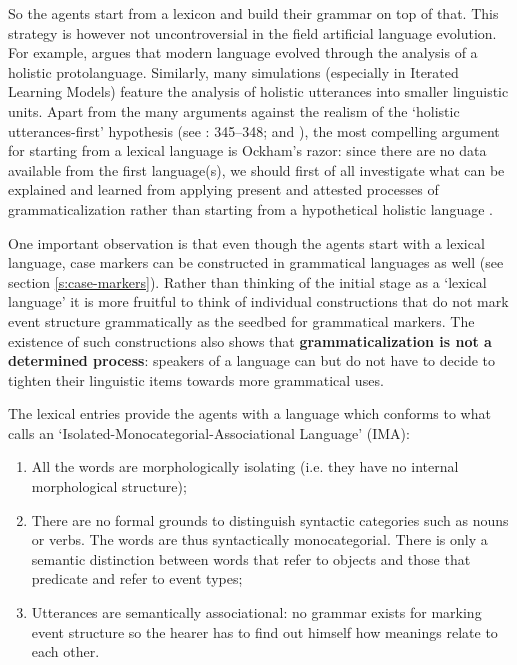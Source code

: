 So the agents start from a lexicon and build their grammar on top of that. This strategy is however not uncontroversial in the field artificial language evolution. For example, \citet{wray98protolanguage, wray02transition} argues that modern language evolved through the analysis of a holistic protolanguage. Similarly, many simulations (especially in Iterated Learning Models) feature the analysis of holistic utterances into smaller linguistic units. Apart from the many arguments against the realism of the `holistic utterances-first' hypothesis (see \citealp{depauw02grael}: 345--348; and \citealp{wellens08flexible}), the most compelling argument for starting from a lexical language is Ockham's razor: since there are no data available from the first language(s), we should first of all investigate what can be explained and learned from applying present and attested processes of grammaticalization rather than starting from a hypothetical holistic language \citep{hoefler08reanalysis}.

One important observation is that even though the agents start with a lexical language, case markers can be constructed in grammatical languages as well (see section \ref{s:case-markers}). Rather than thinking of the initial stage as a `lexical language' it is more fruitful to think of individual constructions that do not mark event structure grammatically as the seedbed for grammatical markers. The existence of such constructions also shows that {\bfseries grammaticalization is not a determined process}: speakers of a language can but do not have to decide to tighten their linguistic items towards more grammatical uses.

The lexical entries provide the agents with a language which conforms to what \citet[124]{gil08how} calls an `Isolated-Monocategorial-Associational Language' (IMA):

\begin{enumerate}
\item All the words are morphologically isolating (i.e. they have no internal morphological structure);
\item There are no formal grounds to distinguish syntactic categories such as nouns or verbs. The words are thus syntactically monocategorial. There is only a semantic distinction between words that refer to objects and those that predicate and refer to event types;
\item Utterances are semantically associational: no grammar exists for marking event structure so the hearer has to find out himself how meanings relate to each other.
\end{enumerate}

